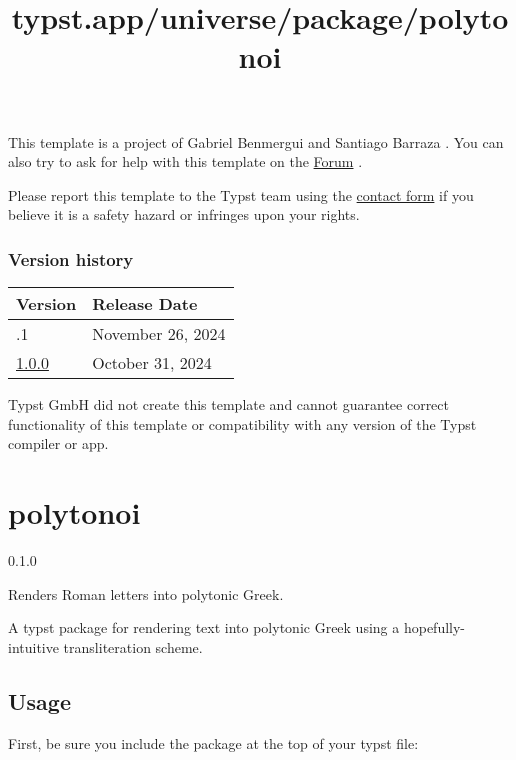 This template is a project of Gabriel Benmergui and Santiago Barraza .
You can also try to ask for help with this template on the
\href{https://forum.typst.app}{Forum} .

Please report this template to the Typst team using the
\href{https://typst.app/contact}{contact form} if you believe it is a
safety hazard or infringes upon your rights.

\label{versions}
\subsubsection{Version history}\label{version-history}

\begin{longtable}[]{@{}ll@{}}
\toprule\noalign{}
Version & Release Date \\
\midrule\noalign{}
\endhead
\bottomrule\noalign{}
\endlastfoot
1.0.1 & November 26, 2024 \\
\href{https://typst.app/universe/package/silver-dev-cv/1.0.0/}{1.0.0} &
October 31, 2024 \\
\end{longtable}

Typst GmbH did not create this template and cannot guarantee correct
functionality of this template or compatibility with any version of the
Typst compiler or app.


\title{typst.app/universe/package/polytonoi}

\label{banner}
\section{polytonoi}\label{polytonoi}

{ 0.1.0 }

Renders Roman letters into polytonic Greek.

\label{readme}
A typst package for rendering text into polytonic Greek using a
hopefully-intuitive transliteration scheme.

\subsection{Usage}\label{usage}

First, be sure you include the package at the top of your typst file:

\begin{Shaded}
\begin{Highlighting}[]
\end{Highlighting}
\end{Shaded}

